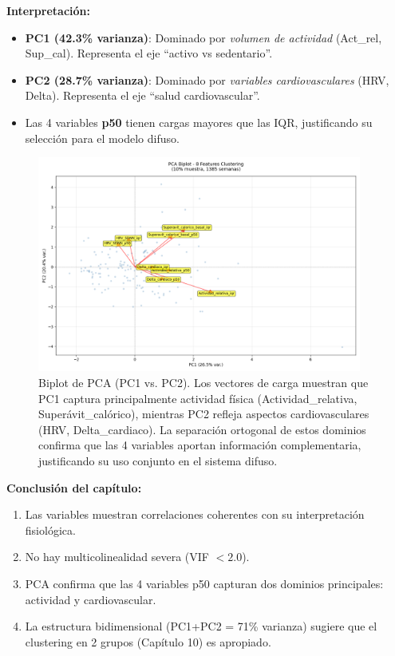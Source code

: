 \documentclass[12pt,letterpaper,twoside]{report}
\begin{document}
\begin{decisionbox}
\textbf{Interpretación:}

\begin{itemize}[noitemsep]
    \item \textbf{PC1 (42.3\% varianza)}: Dominado por \textit{volumen de actividad} (Act\_rel, Sup\_cal). Representa el eje ``activo vs sedentario''.
    \item \textbf{PC2 (28.7\% varianza)}: Dominado por \textit{variables cardiovasculares} (HRV, Delta). Representa el eje ``salud cardiovascular''.
    \item Las 4 variables \textbf{p50} tienen cargas mayores que las IQR, justificando su selección para el modelo difuso.
\end{itemize}
\end{decisionbox}

\begin{figure}[htbp]
\centering
\includegraphics[width=0.95\textwidth]{../analisis_u/semanal/precluster/pca_biplot.png}
\caption{Biplot de PCA (PC1 vs. PC2). Los vectores de carga muestran que PC1 captura principalmente actividad física (Actividad\_relativa, Superávit\_calórico), mientras PC2 refleja aspectos cardiovasculares (HRV, Delta\_cardiaco). La separación ortogonal de estos dominios confirma que las 4 variables aportan información complementaria, justificando su uso conjunto en el sistema difuso.}
\label{fig:pca_biplot}
\end{figure}

\begin{conclusionbox}
\textbf{Conclusión del capítulo:}

\begin{enumerate}[noitemsep]
    \item Las variables muestran correlaciones coherentes con su interpretación fisiológica.
    \item No hay multicolinealidad severa (VIF $< 2.0$).
    \item PCA confirma que las 4 variables p50 capturan dos dominios principales: actividad y cardiovascular.
    \item La estructura bidimensional (PC1+PC2 = 71\% varianza) sugiere que el clustering en 2 grupos (Capítulo 10) es apropiado.
\end{enumerate}
\end{conclusionbox}
\end{document}
